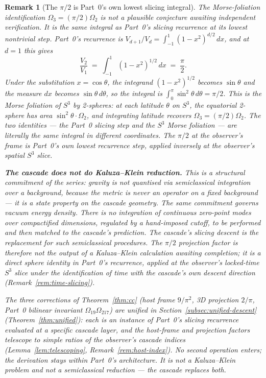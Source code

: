 \documentclass[11pt,a4paper]{article}
\newtheorem{remark}[theorem]{Remark}
\begin{document}
\begin{remark}[The $\pi/2$ is Part~0's own lowest slicing integral]\label{rem:open-pi-over-two}
The Morse-foliation identification $\Omega_3 = (\pi/2)\Omega_2$ is not
a plausible conjecture awaiting independent verification. It is the
same integral as Part~0's slicing recurrence at its lowest nontrivial
step. Part~0's recurrence is
$V_{d+1}/V_d = \int_{-1}^{1}(1-x^2)^{d/2}\,dx$, and at $d = 1$ this
gives
\[
\frac{V_2}{V_1} \;=\; \int_{-1}^{1}(1-x^2)^{1/2}\,dx \;=\; \frac{\pi}{2}.
\]
Under the substitution $x = \cos\theta$, the integrand
$(1-x^2)^{1/2}$ becomes $\sin\theta$ and the measure $dx$ becomes
$\sin\theta\,d\theta$, so the integral is
$\int_0^\pi \sin^2\theta\,d\theta = \pi/2$. This is the Morse
foliation of $S^3$ by 2-spheres: at each latitude $\theta$ on $S^3$,
the equatorial 2-sphere has area $\sin^2\theta\cdot\Omega_2$, and
integrating latitude recovers $\Omega_3 = (\pi/2)\Omega_2$. The two
identities --- the Part~0 slicing step and the $S^3$ Morse foliation
--- are literally the same integral in different coordinates. The
$\pi/2$ at the observer's frame is Part~0's own lowest recurrence
step, applied inversely at the observer's spatial $S^3$ slice.

\medskip\noindent\textbf{The cascade does not do Kaluza--Klein
reduction.} This is a structural commitment of the series: gravity
is not quantised via semiclassical integration over a background,
because the metric is never an operator on a fixed background ---
it is a state property on the cascade geometry. The
same commitment governs vacuum energy density. There is no
integration of continuous zero-point modes over compactified
dimensions, regulated by a hand-imposed cutoff, to be performed and
then matched to the cascade's prediction. The cascade's slicing
descent \emph{is} the replacement for such semiclassical procedures.
The $\pi/2$ projection factor is therefore not the output of a
Kaluza--Klein calculation awaiting completion; it is a direct sphere
identity in Part~0's recurrence, applied at the observer's locked-time
$S^3$ slice under the identification of time with the cascade's own
descent direction (Remark~\ref{rem:time-slicing}).

The three corrections of Theorem~\ref{thm:cc} (host frame $9/\pi^2$,
3D projection $2/\pi$, Part~0 bilinear invariant
$\Omega_{19}\Omega_{217}$) are unified in Section~\ref{subsec:unified-descent}
(Theorem~\ref{thm:unified}): each is an instance of Part~0's slicing
recurrence evaluated at a specific cascade layer, and the host-frame
and projection factors telescope to simple ratios of the observer's
cascade indices (Lemma~\ref{lem:telescoping}, Remark~\ref{rem:host-index}).
No second operation enters; the derivation stays within Part~0's
architecture. It is \emph{not} a Kaluza--Klein problem and \emph{not} a
semiclassical reduction --- the cascade replaces both.
\end{remark}
\end{document}
